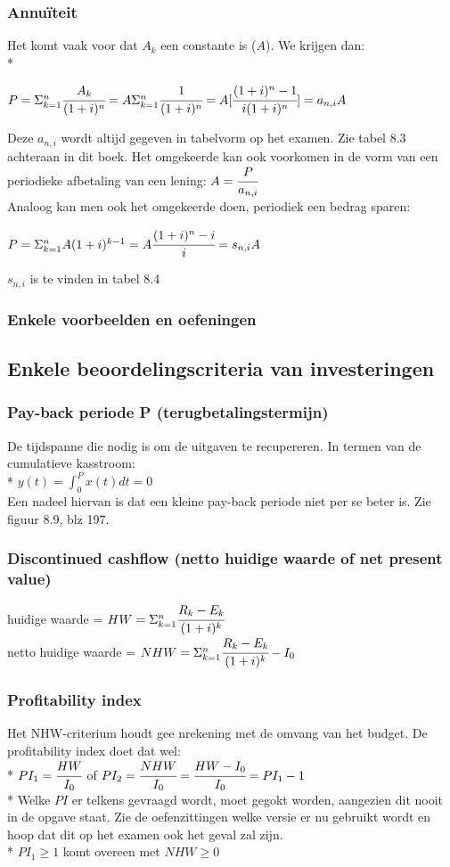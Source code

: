 \documentclass[12pt]{article}
\begin{document}
\subsubsection{Annu\"iteit}
Het komt vaak voor dat $A_k$ een constante is ($A$). We krijgen dan:\\*
\begin{center}
$P = \Sigma_{k = 1}^n\cfrac{A_k}{(1+i)^n}= A\Sigma_{k = 1}^n\cfrac{1}{(1+i)^n} = A[\cfrac{(1+i)^n-1}{i(1+i)^n}] = a_{n,i}A$
\end{center}
Deze $a_{n,i}$ wordt altijd gegeven in tabelvorm op het examen. Zie tabel 8.3 achteraan in dit boek. Het omgekeerde kan ook voorkomen in de vorm van een periodieke afbetaling van een lening: $A = \cfrac{P}{a_{n,i}}$\\
Analoog kan men ook het omgekeerde doen, periodiek een bedrag sparen:
\begin{center}
$P = \Sigma_{k = 1}^nA(1+i)^{k-1} = A\cfrac{(1+i)^n-i}{i} = s_{n,i}A$
\end{center}
$s_{n,i}$ is te vinden in tabel 8.4
\subsubsection{Enkele voorbeelden en oefeningen}
\subsection{Enkele beoordelingscriteria van investeringen}
\subsubsection{Pay-back periode P (terugbetalingstermijn)}
De tijdspanne die nodig is om de uitgaven te recupereren. In termen van de cumulatieve kasstroom:\\*
$y(t) = \int_{0}^Px(t)dt = 0$\\
Een nadeel hiervan is dat een kleine pay-back periode niet per se beter is. Zie figuur 8.9, blz 197.
\subsubsection{Discontinued cashflow (netto huidige waarde of net present value)}
huidige waarde = $HW = \Sigma_{k = 1}^n \cfrac{R_k-E_k}{(1+i)^k}$\\
netto huidige waarde = $NHW = \Sigma_{k = 1}^n \cfrac{R_k-E_k}{(1+i)^k} - I_0$
\subsubsection{Profitability index}
Het NHW-criterium houdt gee nrekening met de omvang van het budget. De profitability index doet dat wel:\\*
$PI_1 = \cfrac{HW}{I_0}$ of $PI_2 = \cfrac{NHW}{I_0} = \cfrac{HW-I_0}{I_0} = PI_1 - 1$\\*
Welke $PI$ er telkens gevraagd wordt, moet gegokt worden, aangezien dit nooit in de opgave staat. Zie de oefenzittingen welke versie er nu gebruikt wordt en hoop dat dit op het examen ook het geval zal zijn.\\*
$PI_1 \ge 1$ komt overeen met $NHW \ge 0$
\end{document}
